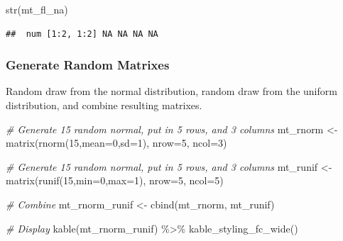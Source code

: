 \documentclass[
]{book}
\newenvironment{Shaded}{\begin{snugshade}}{\end{snugshade}}
\newcommand{\AttributeTok}[1]{\textcolor[rgb]{0.77,0.63,0.00}{#1}}
\newcommand{\CommentTok}[1]{\textcolor[rgb]{0.56,0.35,0.01}{\textit{#1}}}
\newcommand{\DecValTok}[1]{\textcolor[rgb]{0.00,0.00,0.81}{#1}}
\newcommand{\FunctionTok}[1]{\textcolor[rgb]{0.00,0.00,0.00}{#1}}
\newcommand{\NormalTok}[1]{#1}
\newcommand{\OtherTok}[1]{\textcolor[rgb]{0.56,0.35,0.01}{#1}}
\newcommand{\SpecialCharTok}[1]{\textcolor[rgb]{0.00,0.00,0.00}{#1}}
\begin{document}
\begin{Shaded}
\begin{Highlighting}[]
\FunctionTok{str}\NormalTok{(mt\_fl\_na)}
\end{Highlighting}
\end{Shaded}

\begin{verbatim}
##  num [1:2, 1:2] NA NA NA NA
\end{verbatim}

\hypertarget{generate-random-matrixes}{%
\subsubsection{Generate Random Matrixes}\label{generate-random-matrixes}}

Random draw from the normal distribution, random draw from the uniform distribution, and combine resulting matrixes.

\begin{Shaded}
\begin{Highlighting}[]
\CommentTok{\# Generate 15 random normal, put in 5 rows, and 3 columns}
\NormalTok{mt\_rnorm }\OtherTok{\textless{}{-}} \FunctionTok{matrix}\NormalTok{(}\FunctionTok{rnorm}\NormalTok{(}\DecValTok{15}\NormalTok{,}\AttributeTok{mean=}\DecValTok{0}\NormalTok{,}\AttributeTok{sd=}\DecValTok{1}\NormalTok{), }\AttributeTok{nrow=}\DecValTok{5}\NormalTok{, }\AttributeTok{ncol=}\DecValTok{3}\NormalTok{)}

\CommentTok{\# Generate 15 random normal, put in 5 rows, and 3 columns}
\NormalTok{mt\_runif }\OtherTok{\textless{}{-}} \FunctionTok{matrix}\NormalTok{(}\FunctionTok{runif}\NormalTok{(}\DecValTok{15}\NormalTok{,}\AttributeTok{min=}\DecValTok{0}\NormalTok{,}\AttributeTok{max=}\DecValTok{1}\NormalTok{), }\AttributeTok{nrow=}\DecValTok{5}\NormalTok{, }\AttributeTok{ncol=}\DecValTok{5}\NormalTok{)}

\CommentTok{\# Combine}
\NormalTok{mt\_rnorm\_runif }\OtherTok{\textless{}{-}} \FunctionTok{cbind}\NormalTok{(mt\_rnorm, mt\_runif)}

\CommentTok{\# Display}
\FunctionTok{kable}\NormalTok{(mt\_rnorm\_runif) }\SpecialCharTok{\%\textgreater{}\%} \FunctionTok{kable\_styling\_fc\_wide}\NormalTok{()}
\end{Highlighting}
\end{Shaded}
\end{document}
